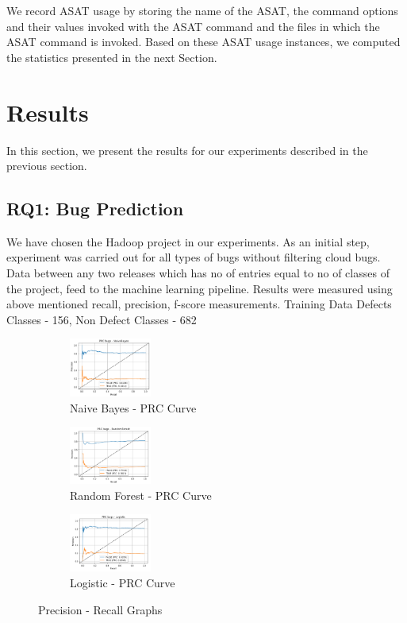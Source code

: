 \documentclass{seal_article}
\begin{document}
We record ASAT usage by storing the name of the ASAT, the command options and their values invoked with the ASAT command and the files in which the ASAT command is invoked. Based on these ASAT usage instances, we computed the statistics presented in the next Section.

\section{Results}
In this section, we present the results for our experiments described in the previous section.

\subsection{RQ1: Bug Prediction}
We have chosen the Hadoop project in our experiments.
As an initial step, experiment was carried out for all types of bugs without filtering cloud bugs. Data between any two releases which has no of entries equal to no of classes of the project, feed to the machine learning pipeline. Results were measured using above mentioned recall, precision, f-score measurements.
\vspace{0.5cm}
Training Data
Defects Classes - 156, Non Defect Classes - 682

\vspace{0.5cm}
\begin{figure}[h] 
\centering
\captionsetup{justification=centering}
\begin{subfigure}{.3\linewidth}
  \centering
  \includegraphics[width=2.7cm]{img/naive.PNG}
  \caption{Naive Bayes - PRC Curve}
  \label{fig:sub1}
\end{subfigure}
\begin{subfigure}{.3\linewidth}
  \centering
  \includegraphics[width=2.7cm]{img/random_forest.PNG}
  \caption{Random Forest - PRC Curve}
  \label{fig:sub1}
\end{subfigure}
\begin{subfigure}{.3\linewidth}
  \centering
  \includegraphics[width=2.7cm]{img/logistic.PNG}
  \caption{Logistic - PRC Curve}
  \label{fig:sub2}
\end{subfigure}
\caption{Precision - Recall Graphs}
\label{fig.aug}
\end{figure} 
\end{document}
